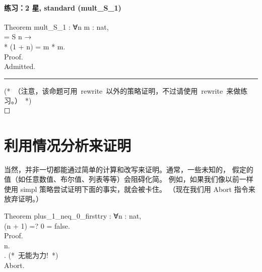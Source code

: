 \documentclass[utf8]{ctexart}
\let\oldparagraph\paragraph
\renewcommand{\paragraph}[1]{\oldparagraph{#1}\mbox{}}
\begin{document}
\protect\hypertarget{lab36}{}{}

\hypertarget{ux7ec3ux4e602-ux661f-standard-mult_s_1}{%
\paragraph{练习：2 星, standard
(mult\_S\_1)}\label{ux7ec3ux4e602-ux661f-standard-mult_s_1}}

{Theorem} {mult\_S\_1} : {∀}{n} {m} : {nat},\\
\hspace*{0.333em}\hspace*{0.333em}{m} = {S} {n} →\\
\hspace*{0.333em}\hspace*{0.333em}{m} * (1 + {n}) = {m} * {m}.\\
{Proof}.\\
\hspace*{0.333em}\hspace*{0.333em}{(*~请在此处解答~*)} {Admitted}.\\

\begin{center}\rule{0.5\linewidth}{\linethickness}\end{center}

{(*~（注意，该命题可用~{{rewrite}}~以外的策略证明，不过请使用~{{rewrite}}~来做练习。）~*)}\\

{☐}

\protect\hypertarget{lab37}{}{}

\hypertarget{ux5229ux7528ux60c5ux51b5ux5206ux6790ux6765ux8bc1ux660e}{%
\section{利用情况分析来证明}\label{ux5229ux7528ux60c5ux51b5ux5206ux6790ux6765ux8bc1ux660e}}

当然，并非一切都能通过简单的计算和改写来证明。通常，一些未知的，
假定的值（如任意数值、布尔值、列表等等）会阻碍化简。
例如，如果我们像以前一样使用 {{simpl}}
策略尝试证明下面的事实，就会被卡住。 （现在我们用 {{Abort}}
指令来放弃证明。）

{Theorem} {plus\_1\_neq\_0\_firsttry} : {∀}{n} : {nat},\\
\hspace*{0.333em}\hspace*{0.333em}({n} + 1) =? 0 = {false}.\\
{Proof}.\\
\hspace*{0.333em}\hspace*{0.333em}{intros} {n}.\\
\hspace*{0.333em}\hspace*{0.333em}{simpl}. {(*~无能为力!~*)}\\
{Abort}.\\
\end{document}
